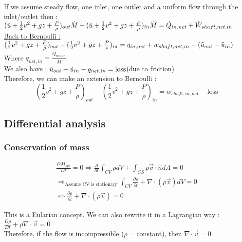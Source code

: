 \documentclass[../main.tex]{subfiles}
\begin{document}
If we assume steady flow, one inlet, one outlet and a uniform flow through the inlet/outlet then : $(\Tilde{u}+\frac{1}{2}v^2+gz+\frac{P}{\rho})_{out} \dot{M} - (\Tilde{u}+\frac{1}{2}v^2+gz+\frac{P}{\rho})_{in} \dot{M} = \dot{Q}_{in,net}+\dot{W}_{shaft,net,in}$\\

\underline{Back to Bernoulli :}\\
$(\frac{1}{2}v^2+gz+\frac{P}{\rho})_{out} - (\frac{1}{2}v^2+gz+\frac{P}{\rho})_{in} = q_{in,net}+w_{shaft,net,in}-(\Tilde{u}_{out}-\Tilde{u}_{in})$\\
Where $q_{net,in} = \frac{\dot{Q}_{net,in}}{\dot{M}}$\\

We also have : $\Tilde{u}_{out}-\Tilde{u}_{in} - q_{net,in} = \text{loss}$(due to friction)\\

Therefore, we can make an extension to Bernoulli :\\
\begin{equation}
    (\frac{1}{2}v^2+gz+\frac{P}{\rho})_{out} - (\frac{1}{2}v^2+gz+\frac{P}{\rho})_{in} = w_{shaft,in,net}-\text{loss}
\end{equation}

\subsection{Differential analysis}
\subsubsection{Conservation of mass}
\begin{equation}
    \begin{gathered}
        \frac{DM_{sys}}{Dt} = 0 \Rightarrow \frac{\partial}{\partial t} \int_{CV} \rho dV + \int_{CS} \rho \Vec{v}\cdot \hat{n}dA = 0\\
        \Rightarrow_{\text{Assume CV is stationary}} \int_{CV} \frac{\partial \rho}{\partial t} + \nabla\cdot (\rho \vec{v})dV = 0\\
        \Leftrightarrow \frac{\partial \rho}{\partial t} + \nabla \cdot(\rho \Vec{v})=0
    \end{gathered}
\end{equation}

This is a Eularian concept. We can also rewrite it in a Lagrangian way : $\frac{D\rho}{Dt} + \rho \nabla \cdot \Vec{v} = 0$\\

Therefore, if the flow is incompressible ($\rho=$constant), then $\nabla \cdot \Vec{v}=0$\\
\end{document}
